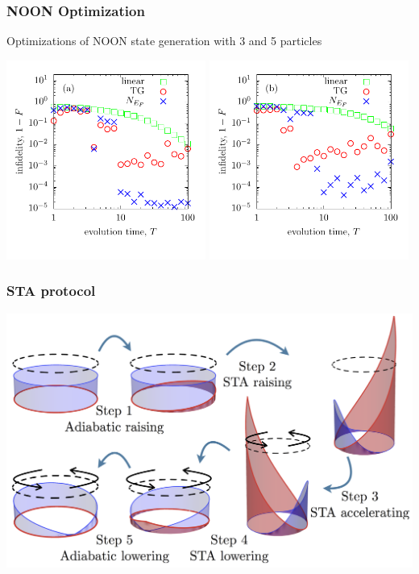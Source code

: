 \documentclass{beamer}
\begin{document}
\begin{frame}
\frametitle{NOON Optimization}
Optimizations of NOON state generation with 3 and 5 particles
\begin{center}
\includegraphics[width=0.49\textwidth]{../data/1d/figTG3.pdf}
\includegraphics[width=0.49\textwidth]{../data/1d/figTG5.pdf}
\end{center}
\end{frame}

\begin{frame}
\frametitle{STA protocol}
\includegraphics[width=\textwidth]{../data/1d/STAscheme.png}
\end{frame}
\end{document}
